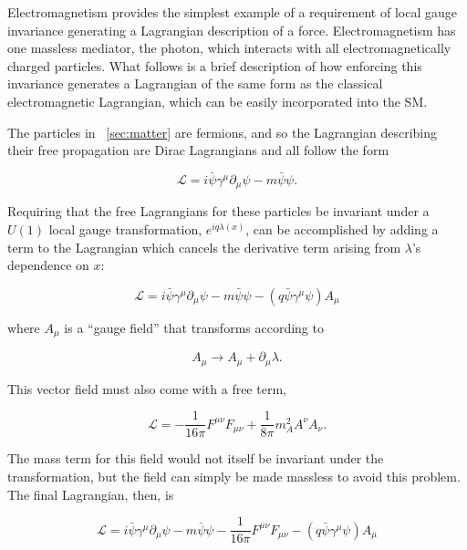 Electromagnetism provides the simplest example of a requirement of local gauge invariance generating a Lagrangian description of a force.
Electromagnetism has one massless mediator, the photon, which interacts with all electromagnetically charged particles. What follows is a brief description of how enforcing this invariance generates a Lagrangian of the same form as the classical electromagnetic Lagrangian, which can be easily incorporated into the \ac{SM}. 

The particles in ~\autoref{sec:matter} are fermions, and so the Lagrangian describing their free propagation are Dirac Lagrangians and all follow the form

\begin{equation}
\mathcal{L} = i\bar{\psi}\gamma^\mu \partial_\mu\psi - m \bar{\psi}\psi . 
\end{equation}

Requiring that the free Lagrangians for these particles be invariant under a $U(1)$ local gauge transformation, $e^{iq\lambda(x)}$, can be accomplished by adding a term to the Lagrangian which cancels the derivative term arising from $\lambda$'s dependence on $x$: 

\begin{equation}
\mathcal{L} = i\bar{\psi}\gamma^\mu \partial_\mu\psi - m \bar{\psi}\psi - (q\bar{\psi}\gamma^\mu\psi)A_\mu
\end{equation}

where $A_\mu$ is a ``gauge field'' that transforms according to 

\begin{equation}
A_\mu \rightarrow A_\mu + \partial_\mu \lambda . 
\end{equation}

This vector field must also come with a free term, 

\begin{equation}
\mathcal{L} = -\frac{1}{16\pi}F^{\mu\nu}F_{\mu\nu} + \frac{1}{8\pi}m_A^2A^\nu A_\nu . 
\end{equation}

The mass term for this field would not itself be invariant under the transformation, but the field can simply be made massless to avoid this problem. The final Lagrangian, then, is 

\begin{equation}
\mathcal{L} = i\bar{\psi}\gamma^\mu \partial_\mu\psi - m \bar{\psi}\psi -\frac{1}{16\pi}F^{\mu\nu}F_{\mu\nu} - (q\bar{\psi}\gamma^\mu\psi)A_\mu
\label{eq:l_em}
\end{equation}

